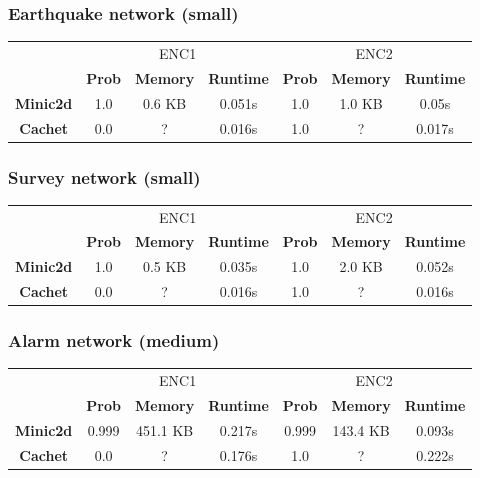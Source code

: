 \subsubsection{Earthquake network (small)}
\begin{table}[H]
    \centering
    \begin{tabular}{c|c|c|c|c|c|c|}
    \cline{2-7}
            & \multicolumn{3}{c|}{ENC1} & \multicolumn{3}{c|}{ENC2} \\ \cline{2-7}
      & \textbf{Prob}  & \textbf{Memory}  & \textbf{Runtime} & \textbf{Prob}  & \textbf{Memory}  & \textbf{Runtime} \\ \cline{1-7}
      \textbf{Minic2d} & 1.0  & 0.6 KB & 0.051s   & 1.0    & 1.0 KB  & 	0.05s \\
      \hline
    \textbf{Cachet}  & 0.0  & ?    & 0.016s       & 1.0     & ?    & 0.017s    \\ \cline{1-7}
    \end{tabular}
\end{table}

\subsubsection{Survey network (small)}
\begin{table}[H]
\centering
    \begin{tabular}{c|c|c|c|c|c|c|}
    \cline{2-7}
            & \multicolumn{3}{c|}{ENC1} & \multicolumn{3}{c|}{ENC2} \\ \cline{2-7}
      & \textbf{Prob}  & \textbf{Memory}  & \textbf{Runtime} & \textbf{Prob}  & \textbf{Memory}  & \textbf{Runtime} \\ \cline{1-7}
      \textbf{Minic2d} & 1.0  & 0.5 KB    & 0.035s   & 1.0    & 2.0 KB    & 	0.052s \\
      \hline
    \textbf{Cachet}  & 0.0  & ?    & 0.016s       & 1.0     & ?    & 0.016s    \\ \cline{1-7}
    \end{tabular}
\end{table}

\subsubsection{Alarm network (medium)}
\begin{table}[H]
    \centering
    \begin{tabular}{c|c|c|c|c|c|c|}
    \cline{2-7}
            & \multicolumn{3}{c|}{ENC1} & \multicolumn{3}{c|}{ENC2} \\ \cline{2-7}
      & \textbf{Prob}  & \textbf{Memory}  & \textbf{Runtime} & \textbf{Prob}  & \textbf{Memory}  & \textbf{Runtime} \\ \cline{1-7}
      \textbf{Minic2d} & 0.999  & 451.1 KB    & 0.217s   & 0.999    & 143.4 KB    & 	0.093s \\
      \hline
    \textbf{Cachet}  & 0.0  & ?    & 0.176s       & 1.0     & ?    & 0.222s    \\ \cline{1-7}
\end{tabular}
\end{table}

